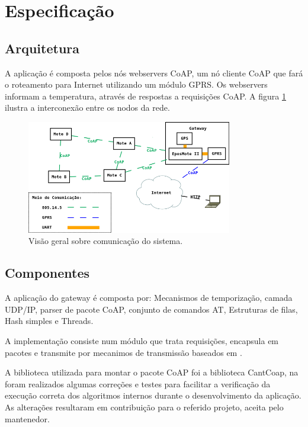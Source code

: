 \section{Especifica\c{c}\~ao}
\subsection{Arquitetura}

A aplica\c{c}\~ao \'e composta pelos n\'os webservers CoAP, um n\'o cliente CoAP que far\'a o roteamento para Internet utilizando um m\'odulo GPRS.  Os webservers informam a temperatura, atrav\'es de respostas a requisi\c{c}\~oes CoAP. A figura \ref{arquitetura} ilustra a interconex\~ao entre os nodos da rede.

\begin{figure}[H]
   \label{arquitetura}
   \centering
   \includegraphics[width=0.8\textwidth]{figuras/arquitetura.png}
   \caption{Vis\~ao geral sobre comunica\c{c}\~ao do sistema.}
\end{figure}

\subsection{Componentes}
A aplica\c{c}\~ao do gateway \'e composta por: Mecanismos de temporiza\c{c}\~ao, camada UDP/IP, parser de pacote CoAP, conjunto de comandos AT, Estruturas de filas, Hash simples e Threads.

A implementa\c{c}\~ao consiste num m\'odulo que trata requisi\c{c}\~oes, encapsula em pacotes e transmite por mecanimos de transmiss\~ao baseados em \cite{draft-ietf-core-coap-18}.

A biblioteca utilizada para montar o pacote CoAP foi a biblioteca CantCoap, na foram realizados algumas corre\c{c}\~oes e testes para facilitar a verifica\c{c}\~ao da execu\c{c}\~ao correta dos algoritmos internos durante o desenvolvimento da aplica\c{c}\~ao. As altera\c{c}\~oes resultaram em contribui\c{c}\~ao para o referido projeto, aceita pelo mantenedor.


